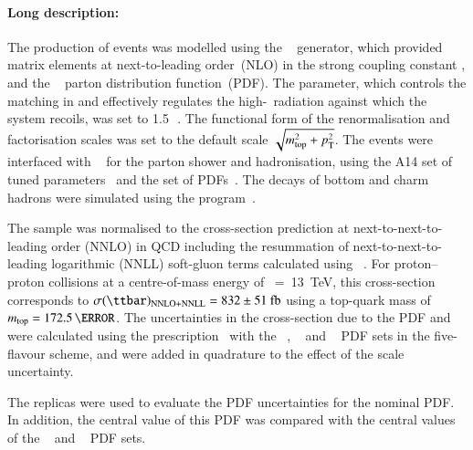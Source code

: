 

\paragraph{Long description:}

The production of \ttbar events was modelled using the
\POWHEGBOX[v2]~\cite{Frixione:2007nw,Nason:2004rx,Frixione:2007vw,Alioli:2010xd}
generator, which provided matrix elements at next-to-leading
order~(NLO) in the strong coupling constant \alphas, and the
\NNPDF[3.0nlo]~\cite{Ball:2014uwa} parton distribution function~(PDF). 
The \hdamp parameter, which controls the matching in \POWHEG and
effectively regulates the high-\pt\ radiation against which the
\ttbar system recoils, was set to 1.5\,\mtop~\cite{ATL-PHYS-PUB-2016-020}.
The functional form of the renormalisation and factorisation scales was
set to the default scale $\sqrt{m_{\textrm{top}}^2 + p_{\textrm T}^2}$.
The events were interfaced with
\PYTHIA[8.230]~\cite{Sjostrand:2014zea} for the parton shower and
hadronisation, using the A14 set of tuned
parameters~\cite{ATL-PHYS-PUB-2014-021} and the \NNPDF[2.3lo]
set of PDFs~\cite{Ball:2012cx}.
The decays of bottom and charm hadrons were simulated using the
\EVTGEN[1.6.0] program~\cite{Lange:2001uf}.

The \ttbar sample was normalised to the cross-section prediction at next-to-next-to-leading order (NNLO)
in QCD including the resummation of next-to-next-to-leading logarithmic (NNLL) soft-gluon terms calculated using
\TOPpp[2.0]~\cite{Beneke:2011mq,Cacciari:2011hy,Baernreuther:2012ws,Czakon:2012zr,Czakon:2012pz,Czakon:2013goa,Czakon:2011xx}.
For proton--proton collisions at a centre-of-mass energy of \rts~=~\SI{13}{\TeV}, this cross-section corresponds to
$\sigma(\ttbar)_{\textrm{NNLO+NNLL}} = \mathrm{832\pm51~fb}$ using a top-quark mass of $\mtop = 172.5\,\GeV$.
The uncertainties in the cross-section due to the PDF and \alphas were calculated using the \PDFforLHC[15] prescription~\cite{Butterworth:2015oua}
with the \MSTW[nnlo]~\cite{Martin:2009iq,Martin:2009bu}, \CT[10nnlo]~\cite{Lai:2010vv,Gao:2013xoa} 
and \NNPDF[2.3lo]~\cite{Ball:2012cx} PDF sets in the five-flavour scheme, and were added in quadrature to the effect of the scale uncertainty.



The \NNPDF[3.0lo] replicas were used to evaluate the PDF uncertainties for the nominal PDF.
In addition, the central value of this PDF was compared with the central values of the 
\CT[14nnlo]~\cite{Dulat:2015mca} and \MMHT[nnlo]~\cite{Harland-Lang:2014zoa} PDF sets.

